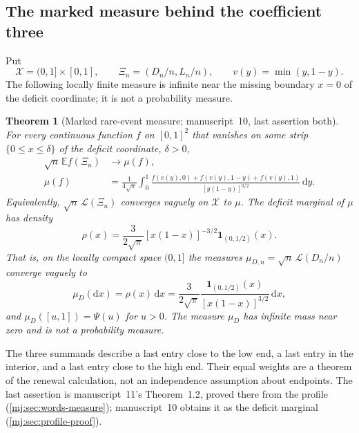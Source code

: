 \documentclass[11pt,a4paper]{article}
\newtheorem{theorem}{Theorem}[section]
\theoremstyle{definition}\newaliascnt{definition}{theorem}
\theoremstyle{remark}\newaliascnt{remark}{theorem}
\newcommand{\one}{\mathbf 1}
\newcommand{\dd}{\mathrm d}
\newcommand{\ljE}{\mathbb E}
\newcommand{\ljLaw}{\mathcal L}
\begin{document}
\subsection{The marked measure behind the coefficient three}
Put
\[
 \mathcal X=(0,1]\times[0,1],\qquad
 \Xi_n=(D_n/n,L_n/n),\qquad v(y)=\min(y,1-y).
\]
The following locally finite measure is infinite near the missing boundary
$x=0$ of the deficit coordinate; it is not a probability measure.

\begin{theorem}[Marked rare-event measure; manuscript~10, last assertion both]
\label{mj:thm:marked}
For every continuous function $f$ on $[0,1]^2$ that vanishes on some strip
$\{0\le x\le\delta\}$ of the deficit coordinate, $\delta>0$,
\begin{align}
 \sqrt n\,\ljE f(\Xi_n)&\longrightarrow\mu(f),\label{mj:eq:marked-limit}\\
 \mu(f)&=\frac1{4\sqrt\pi}\int_0^1
 \frac{f(v(y),0)+f(v(y),1-y)+f(v(y),1)}
 {[y(1-y)]^{3/2}}\,\dd y.
 \label{mj:eq:marked-measure}
\end{align}
Equivalently, $\sqrt n\,\ljLaw(\Xi_n)$ converges vaguely on $\mathcal X$ to
$\mu$. The deficit marginal of $\mu$ has density
\begin{equation}
 \rho(x)=\frac3{2\sqrt\pi}[x(1-x)]^{-3/2}\one_{(0,1/2)}(x).
 \label{mj:eq:rho}
\end{equation}
That is, on the locally compact space $(0,1]$ the measures
$\mu_{D,n}=\sqrt n\,\ljLaw(D_n/n)$ converge vaguely to
\begin{equation}
 \mu_D(\dd x)=\rho(x)\,\dd x=\frac3{2\sqrt\pi}
 \frac{\one_{(0,1/2)}(x)}{[x(1-x)]^{3/2}}\,\dd x,
 \label{mj:eq:measure}
\end{equation}
and $\mu_D([u,1])=\Psi(u)$ for $u>0$. The measure $\mu_D$ has infinite mass
near zero and is not a probability measure.
\end{theorem}

The three summands describe a last entry close to the low end, a last entry
in the interior, and a last entry close to the high end. Their equal weights
are a theorem of the renewal calculation, not an independence assumption
about endpoints. The last assertion is manuscript~11's Theorem~1.2, proved
there from the profile (\cref{mj:sec:words-measure}); manuscript~10 obtains
it as the deficit marginal (\cref{mj:sec:profile-proof}).
\end{document}
